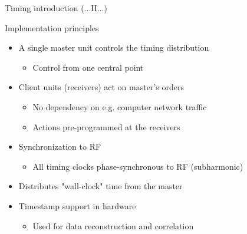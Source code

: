 \documentclass[
  9pt
  , table
  , ignorenonframetext
]{beamer}
\begin{document}
\begin{frame}{Timing introduction (...II...)}
  \begin{block}{Implementation principles}
    \begin{itemize}
    \item A single master unit controls the timing distribution
    \begin{itemize}
      \item Control from one central point
    \end{itemize}
    \item Client units (receivers) act on master’s orders
    \begin{itemize}
      \item No dependency on e.g. computer network traffic
      \item Actions pre-programmed at the receivers
    \end{itemize}
    \item Synchronization to RF
    \begin{itemize}
      \item All timing clocks phase-synchronous to RF (subharmonic)
    \end{itemize}
    \item Distributes "wall-clock" time from the master
      \item Timestamp support in hardware
    \begin{itemize}
      \item Used for data reconstruction and correlation
    \end{itemize}
    \end{itemize}
  \end{block}
\end{frame}
\end{document}
